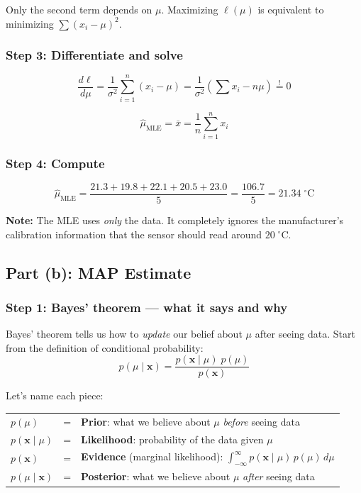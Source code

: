 \documentclass[11pt]{article}
\begin{document}
Only the second term depends on $\mu$. Maximizing $\ell(\mu)$ is equivalent to minimizing $\sum(x_i - \mu)^2$.

\subsubsection*{Step 3: Differentiate and solve}
\[
  \frac{d\ell}{d\mu} = \frac{1}{\sigma^2}\sum_{i=1}^n (x_i - \mu) = \frac{1}{\sigma^2}\left(\sum x_i - n\mu\right) \stackrel{!}{=} 0
\]

\[
  \boxed{\hat\mu_{\text{MLE}} = \bar{x} = \frac{1}{n}\sum_{i=1}^n x_i}
\]

\subsubsection*{Step 4: Compute}
\[
  \hat\mu_{\text{MLE}} = \frac{21.3 + 19.8 + 22.1 + 20.5 + 23.0}{5} = \frac{106.7}{5} = 21.34\;{}^\circ\text{C}
\]

\textbf{Note:} The MLE uses \textit{only} the data. It completely ignores the manufacturer's calibration information that the sensor should read around $20\;{}^\circ\text{C}$.


\subsection*{Part (b): MAP Estimate}

\subsubsection*{Step 1: Bayes' theorem --- what it says and why}

Bayes' theorem tells us how to \textit{update} our belief about $\mu$ after seeing data. Start from the definition of conditional probability:
\[
  p(\mu \mid \mathbf{x}) = \frac{p(\mathbf{x} \mid \mu)\; p(\mu)}{p(\mathbf{x})}
\]

Let's name each piece:

\begin{center}
\renewcommand{\arraystretch}{1.5}
\begin{tabular}{lcl}
$p(\mu)$ & = & \textbf{Prior}: what we believe about $\mu$ \textit{before} seeing data \\
$p(\mathbf{x} \mid \mu)$ & = & \textbf{Likelihood}: probability of the data given $\mu$ \\
$p(\mathbf{x})$ & = & \textbf{Evidence} (marginal likelihood): $\displaystyle\int_{-\infty}^{\infty} p(\mathbf{x} \mid \mu)\,p(\mu)\,d\mu$ \\
$p(\mu \mid \mathbf{x})$ & = & \textbf{Posterior}: what we believe about $\mu$ \textit{after} seeing data
\end{tabular}
\end{center}
\end{document}
